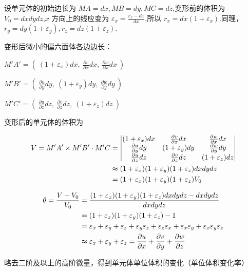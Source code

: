 \documentclass[12pt,a4paper]{article}
\begin{document}
设单元体的初始边长为 $MA=dx,MB=dy,MC=dz$,变形前的体积为 $V_0=dxdydz$,$x$ 方向上的线应变为 $\varepsilon_x=\frac{r_x-dx}{dx}$,所以 $r_x=dx(1+\varepsilon_x)$.同理，$r_y=dy(1+\varepsilon_y),r_z=dz(1+\varepsilon_z)$.

变形后微小的偏六面体各边边长：

$M'A'=\left(~(1+\varepsilon_x)dx,~ \frac{\partial v}{\partial x}dx,~ \frac{\partial w}{\partial x}dx~\right)$

$M'B'=\left(~\frac{\partial u}{\partial y}dy,~ (1+\varepsilon_y)dy,~ \frac{\partial w}{\partial y}dy~\right)$

$M'C'=\left(~\frac{\partial u}{\partial z}dz,~ \frac{\partial v}{\partial z}dz,~ (1+\varepsilon_z)dz~\right)$

变形后的单元体的体积为

\begin{align*}
V = M'A'\times M'B'\cdot M'C & = \begin{vmatrix}
(1+\varepsilon_x)dx & \frac{\partial v}{\partial x}dx & \frac{\partial w}{\partial x}dx \\
\frac{\partial u}{\partial y}dy & (1+\varepsilon_y)dy & \frac{\partial w}{\partial y}dy \\
\frac{\partial u}{\partial z}dz & \frac{\partial v}{\partial z}dz & (1+\varepsilon_z)dz
\end{vmatrix} \\
& \thickapprox (1+\varepsilon_x)(1+\varepsilon_y)(1+\varepsilon_z)dxdydz \\
& = (1+\varepsilon_x)(1+\varepsilon_y)(1+\varepsilon_z)V_0
\end{align*}

\begin{align*}
\theta=\frac{V-V_0}{V_0} & = \frac{(1+\varepsilon_x)(1+\varepsilon_y)(1+\varepsilon_z)dxdydz-dxdydz}{dxdydz} \\
& = (1+\varepsilon_x)(1+\varepsilon_y)(1+\varepsilon_z)-1 \\
& = \varepsilon_x+\varepsilon_y+\varepsilon_z+\varepsilon_y\varepsilon_z+\varepsilon_z\varepsilon_x+\varepsilon_x\varepsilon_y+\varepsilon_x\varepsilon_y\varepsilon_z \\
& \thickapprox\varepsilon_x+\varepsilon_y+\varepsilon_z=\frac{\partial u}{\partial x}+\frac{\partial v}{\partial y}+\frac{\partial w}{\partial z} 
\end{align*}

略去二阶及以上的高阶微量，得到单元体单位体积的变化（单位体积变化率）

~\\
\end{document}
